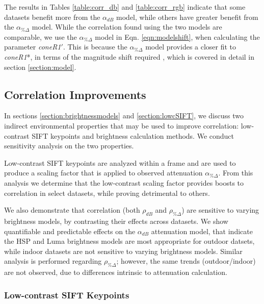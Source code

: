 
The results in Tables \ref{table:corr_db} and \ref{table:corr_rgb} indicate that some datasets benefit more from the $\alpha_{dB}$ model, while others have greater benefit from the $\alpha_{\%\Delta}$ model. While the correlation found using the two models are comparable, we use the $\alpha_{\%\Delta}$ model in Eqn. \ref{eqn:modelshift}, when calculating the parameter \textit{coneR1}$'$. This is because the $\alpha_{\%\Delta}$ model provides a closer fit to \textit{coneR1}*, in terms of the magnitude shift required , which is covered in detail in section \ref{section:model}.

\FloatBarrier
\subsection{Correlation Improvements} \label{section:corrimprovements}

In sections \ref{section:brightnessmodels} and \ref{section:lowcSIFT}, we discuss two indirect environmental properties that may be used to improve correlation: low-contrast SIFT keypoints and brightness calculation methods. We conduct sensitivity analysis on the two properties.

Low-contrast SIFT keypoints are analyzed within a frame and are used to produce a scaling factor that is applied to observed attenuation $\alpha_{\%\Delta}$. From this analysis we determine that the low-contrast scaling factor provides boosts to correlation in select datasets, while proving detrimental to others.

We also demonstrate that correlation (both $\rho_{dB}$ and $\rho_{\%\Delta}$) are sensitive to varying brightness models, by contrasting their effects across datasets. We show quantifiable and predictable effects on the $\alpha_{dB}$ attenuation model, that indicate the HSP and Luma brightness models are most appropriate for outdoor datsets, while indoor datasets are not sensitive to varying brightness models. Similar analysis is performed regarding $\rho_{\%\Delta}$; however, the same trends (outdoor/indoor) are not observed, due to differences intrinsic to attenuation calculation.

\subsubsection{Low-contrast SIFT Keypoints} \label{section:lowcsensitivity}

